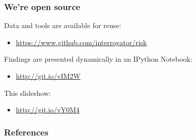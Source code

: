 \documentclass{beamer}       %
\begin{document}
\begin{frame}
    \frametitle{We're open source}

    Data and tools are available for reuse:
    \begin{itemize}
    \item \url{https://www.github.com/interrogator/risk}
    \end{itemize}
    Findings are presented dynamically in an IPython Notebook: 
    \begin{itemize}
    \item \url{http://git.io/vIM2W}
    \end{itemize}
    This slideshow:
    \begin{itemize}
    \item \url{http://git.io/vY0M4}
    \end{itemize}
\end{frame}


    \begin{frame}[t,allowframebreaks]
    \frametitle{References}
    
    
    \end{frame}
    
    
\end{document}
